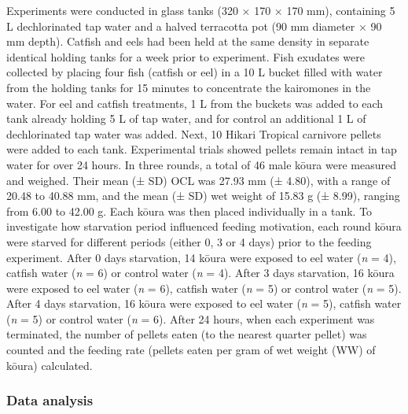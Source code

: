 \documentclass[
  letterpaper,
  DIV=11,
  numbers=noendperiod]{scrartcl}
\begin{document}
Experiments were conducted in glass tanks (320 × 170 × 170 mm),
containing 5 L dechlorinated tap water and a halved terracotta pot (90
mm diameter × 90 mm depth). Catfish and eels had been held at the same
density in separate identical holding tanks for a week prior to
experiment. Fish exudates were collected by placing four fish (catfish
or eel) in a 10 L bucket filled with water from the holding tanks for 15
minutes to concentrate the kairomones in the water. For eel and catfish
treatments, 1 L from the buckets was added to each tank already holding
5 L of tap water, and for control an additional 1 L of dechlorinated tap
water was added. Next, 10 Hikari Tropical carnivore pellets were added
to each tank. Experimental trials showed pellets remain intact in tap
water for over 24 hours. In three rounds, a total of 46 male kōura were
measured and weighed. Their mean (± SD) OCL was 27.93 mm (± 4.80), with
a range of 20.48 to 40.88 mm, and the mean (± SD) wet weight of 15.83 g
(± 8.99), ranging from 6.00 to 42.00 g. Each kōura was then placed
individually in a tank. To investigate how starvation period influenced
feeding motivation, each round kōura were starved for different periods
(either 0, 3 or 4 days) prior to the feeding experiment. After 0 days
starvation, 14 kōura were exposed to eel water (\emph{n} = 4), catfish
water (\emph{n} = 6) or control water (\emph{n} = 4). After 3 days
starvation, 16 kōura were exposed to eel water (\emph{n} = 6), catfish
water (\emph{n} = 5) or control water (\emph{n} = 5). After 4 days
starvation, 16 kōura were exposed to eel water (\emph{n} = 5), catfish
water (\emph{n} = 5) or control water (\emph{n} = 6). After 24 hours,
when each experiment was terminated, the number of pellets eaten (to the
nearest quarter pellet) was counted and the feeding rate (pellets eaten
per gram of wet weight (WW) of kōura) calculated.

\subsubsection{Data analysis}\label{data-analysis}
\end{document}
